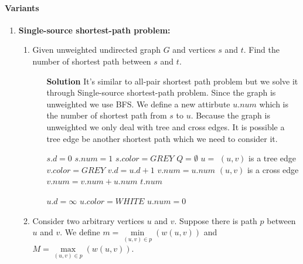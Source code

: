 \documentclass{book}
\begin{document}
	\paragraph{Variants}
	\begin{enumerate}
	\item \textbf{Single-source shortest-path problem:}
	\begin{enumerate}
		\item Given unweighted undirected graph $G$ and vertices $s$ and $t$. Find the number of shortest path between $s$ and $t$.
		\begin{itemize}
			\item[\textbf{Solution}] It's similar to all-pair shortest path problem but we solve it through Single-source shortest-path problem. Since the graph is unweighted we use BFS. We define a new attirbute $u.num$ which is the number of shortest path from $s$ to $u$. Because the graph is unweighted we only deal with tree and cross edges. It is possible a tree edge be another shortest path which we need to consider it.
			\begin{algorithm*}[h!]
				\begin{algorithmic}[1]
						\State \Call{INIT-BFS}{G}
						\State $s.d = 0$
						\State $s.num = 1$
						\State $s.color = GREY$
						\State $Q = \emptyset$						
						\State {}
							\State $u = $ 
								 \Comment $(u, v)$ is a tree edge
									\State $v.color = GREY$
									\State $v.d = u.d + 1$
									\State $v.num = u.num$
									\State {}
								 \Comment $(u, v)$ is a cross edge
									\State $v.num = v.num + u.num$
								\EndIf
							\EndFor
						\EndWhile
						\State \Return $t.num$
					\EndFunction
				\end{algorithmic}
			\end{algorithm*}
			\begin{algorithm*}[h!]
				\begin{algorithmic}
							\State $u.d = \infty$
							\State $u.color = WHITE$
							\State $u.num = 0$
						\EndFor
					\EndFunction
				\end{algorithmic}
			\end{algorithm*}
			\FloatBarrier
		\end{itemize}
		\item Consider two arbitrary vertices $u$ and $v$. Suppose there is path $p$ between $u$ and $v$. We define $m = \min\limits_{(u, v) \in p}(w(u, v))$ and $M = \max\limits_{(u, v) \in p}(w(u, v))$.

\end{enumerate}
\end{enumerate}
\end{document}
